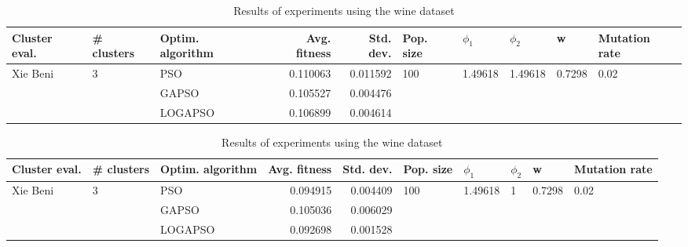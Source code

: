 \documentclass{article}
\begin{document}
\begin{table}
\centering
\caption{Results of experiments using the wine dataset}
\begin{tabular}{lllrrlllll}
\toprule
            Cluster eval. &        \# clusters & Optim. algorithm &  Avg. fitness &  Std. dev. &            Pop. size &               $\phi_{1}$ &               $\phi_{2}$ &                       w &         Mutation rate \\
\midrule
\multirow{3}{*}{Xie Beni} & \multirow{3}{*}{3} &              PSO &      0.110063 &   0.011592 & \multirow{3}{*}{100} & \multirow{3}{*}{1.49618} & \multirow{3}{*}{1.49618} & \multirow{3}{*}{0.7298} & \multirow{3}{*}{0.02} \\
                          &                    &            GAPSO &      0.105527 &   0.004476 &                      &                          &                          &                         &                       \\
                          &                    &          LOGAPSO &      0.106899 &   0.004614 &                      &                          &                          &                         &                       \\
\bottomrule
\end{tabular}
\end{table}
\begin{table}
\centering
\caption{Results of experiments using the wine dataset}
\begin{tabular}{lllrrlllll}
\toprule
            Cluster eval. &        \# clusters & Optim. algorithm &  Avg. fitness &  Std. dev. &            Pop. size &               $\phi_{1}$ &         $\phi_{2}$ &                       w &         Mutation rate \\
\midrule
\multirow{3}{*}{Xie Beni} & \multirow{3}{*}{3} &              PSO &      0.094915 &   0.004409 & \multirow{3}{*}{100} & \multirow{3}{*}{1.49618} & \multirow{3}{*}{1} & \multirow{3}{*}{0.7298} & \multirow{3}{*}{0.02} \\
                          &                    &            GAPSO &      0.105036 &   0.006029 &                      &                          &                    &                         &                       \\
                          &                    &          LOGAPSO &      0.092698 &   0.001528 &                      &                          &                    &                         &                       \\
\bottomrule
\end{tabular}
\end{table}
\end{document}
